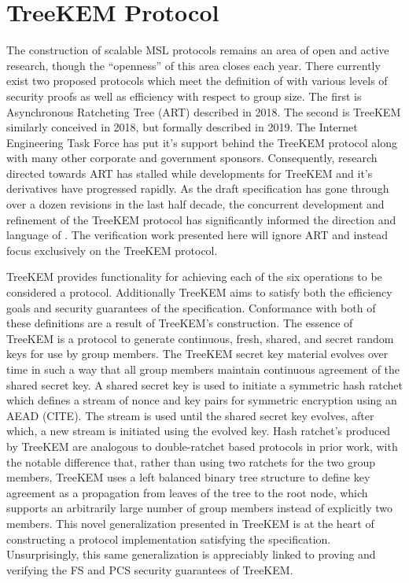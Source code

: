 \hypertarget{treekem-protocol}{%
\section{TreeKEM Protocol}\label{treekem-protocol}}

The construction of scalable MSL protocols remains an area of open and active research, though the ``openness'' of this area closes each year.
There currently exist two proposed protocols which meet the definition of  with various levels of security proofs as well as efficiency with respect to group size.
The first is Asynchronous Ratcheting Tree (ART) \autocite{cohn2018ends} described in 2018.
The second is TreeKEM \autocite{bhargavan:hal-02425247} similarly conceived in 2018, but formally described in 2019.
The Internet Engineering Task Force has put it's support behind the TreeKEM protocol along with many other corporate and government sponsors.
Consequently, research directed towards ART has stalled while developments for TreeKEM and it's derivatives have progressed rapidly.
As the  draft specification has gone through over a dozen revisions in the last half decade, the concurrent development and refinement of the TreeKEM protocol has significantly informed the direction and language of .
The verification work presented here will ignore ART and instead focus exclusively on the TreeKEM protocol.

TreeKEM provides functionality for achieving each of the six operations to be considered a  protocol.
Additionally TreeKEM aims to satisfy both the efficiency goals and security guarantees of the  specification.
Conformance with both of these definitions are a result of TreeKEM's construction.
The essence of TreeKEM is a protocol to generate continuous, fresh, shared, and secret random keys for use by group members.
The TreeKEM secret key material evolves over time in such a way that all group members maintain continuous agreement of the shared secret key.
A shared secret key is used to initiate a symmetric hash ratchet which defines a stream of nonce and key pairs for symmetric encryption using an AEAD (CITE).
The stream is used until the shared secret key evolves, after which, a new stream is initiated using the evolved key.
Hash ratchet's produced by TreeKEM are analogous to double-ratchet based protocols in prior work, with the notable difference that, rather than using two ratchets for the two group members, TreeKEM uses a left balanced binary tree structure to define key agreement as a propagation from leaves of the tree to the root node, which supports an arbitrarily large number of group members instead of explicitly two members.
This novel generalization presented in TreeKEM is at the heart of constructing a protocol implementation satisfying the  specification.
Unsurprisingly, this same generalization is appreciably linked to proving and verifying the FS and PCS security guarantees of TreeKEM.

